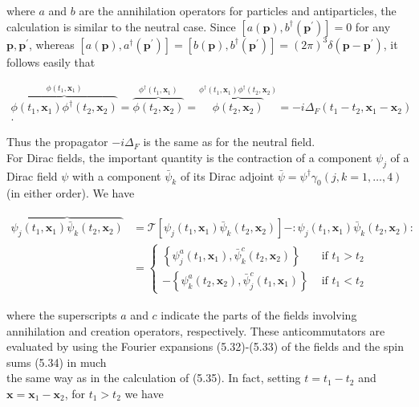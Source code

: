 \documentclass[10pt, letterpaper]{article}
\begin{document}
where $a$ and $b$ are the annihilation operators for particles and antiparticles, the calculation is similar to the neutral case. Since $\left[a(\mathbf{p}), b^{\dagger}\left(\mathbf{p}^{\prime}\right)\right]=0$ for any $\mathbf{p}, \mathbf{p}^{\prime}$, whereas $\left[a(\mathbf{p}), a^{\dagger}\left(\mathbf{p}^{\prime}\right)\right]=\left[b(\mathbf{p}), b^{\dagger}\left(\mathbf{p}^{\prime}\right)\right]=(2 \pi)^{3} \delta\left(\mathbf{p}-\mathbf{p}^{\prime}\right)$, it follows easily that

$$
\begin{gathered}
\overbrace{\phi\left(t_{1}, \mathbf{x}_{1}\right) \phi^{\dagger}\left(t_{2}, \mathbf{x}_{2}\right)}^{\phi\left(t_{1}, \mathbf{x}_{1}\right)}=\overbrace{\phi\left(t_{2}, \mathbf{x}_{2}\right)}^{\phi^{\dagger}\left(t_{1}, \mathbf{x}_{1}\right)}=\overbrace{\phi\left(t_{2}, \mathbf{x}_{2}\right)}^{\phi^{\dagger}\left(t_{1}, \mathbf{x}_{1}\right) \phi^{\dagger}\left(t_{2}, \mathbf{x}_{2}\right)}=-i \Delta_{F}\left(t_{1}-t_{2}, \mathbf{x}_{1}-\mathbf{x}_{2}\right) \\
.
\end{gathered}
$$

Thus the propagator $-i \Delta_{F}$ is the same as for the neutral field.\\
For Dirac fields, the important quantity is the contraction of a component $\psi_{j}$ of a Dirac field $\psi$ with a component $\bar{\psi}_{k}$ of its Dirac adjoint $\bar{\psi}=\psi^{\dagger} \gamma_{0}(j, k=1, \ldots, 4)$ (in either order). We have

$$
\begin{aligned}
\overbrace{\psi_{j}\left(t_{1}, \mathbf{x}_{1}\right) \bar{\psi}_{k}\left(t_{2}, \mathbf{x}_{2}\right)} & =\mathcal{T}\left[\psi_{j}\left(t_{1}, \mathbf{x}_{1}\right) \bar{\psi}_{k}\left(t_{2}, \mathbf{x}_{2}\right)\right]-: \psi_{j}\left(t_{1}, \mathbf{x}_{1}\right) \bar{\psi}_{k}\left(t_{2}, \mathbf{x}_{2}\right): \\
& = \begin{cases}\left\{\psi_{j}^{a}\left(t_{1}, \mathbf{x}_{1}\right), \bar{\psi}_{k}^{c}\left(t_{2}, \mathbf{x}_{2}\right)\right\} & \text { if } t_{1}>t_{2} \\
-\left\{\psi_{k}^{a}\left(t_{2}, \mathbf{x}_{2}\right), \bar{\psi}_{j}^{c}\left(t_{1}, \mathbf{x}_{1}\right)\right\} & \text { if } t_{1}<t_{2}\end{cases}
\end{aligned}
$$

where the superscripts $a$ and $c$ indicate the parts of the fields involving annihilation and creation operators, respectively. These anticommutators are evaluated by using the Fourier expansions (5.32)-(5.33) of the fields and the spin sums (5.34) in much\\
the same way as in the calculation of (5.35). In fact, setting $t=t_{1}-t_{2}$ and $\mathbf{x}=\mathbf{x}_{1}-\mathbf{x}_{2}$, for $t_{1}>t_{2}$ we have
\end{document}
